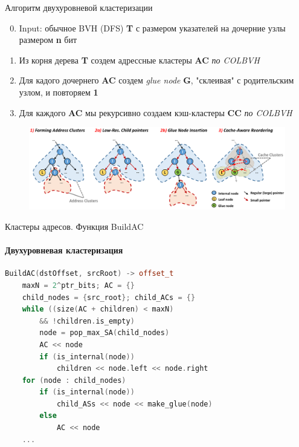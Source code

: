 \begin{frame}{Алгоритм двухуровневой кластеризации}
    \begin{enumerate}
        \setcounter{enumi}{-1}
        \item
            Input: обычное BVH (DFS) \textbf{T} с размером указателей на дочерние узлы размером \textbf{n} бит
        \item
            Из корня дерева \textbf{T} создем адрессные кластеры \textbf{AC} \textit{по COLBVH}
        \item
            Для кадого дочернего \textbf{AC} создем \textit{glue node} \textbf{G}, "склеивая" с родительским узлом, 
            и повторяем \textbf{1}
        \item
            Для каждого \textbf{AC} мы рекурсивно создаем кэш-кластеры \textbf{CC} \textit{по COLBVH}
    \end{enumerate}
    \begin{figure}
        \includegraphics[keepaspectratio, width=\textwidth]{res/2lvl_clustering.png}
    \end{figure}
\end{frame}

\begin{frame}[fragile]{Кластеры адресов. Функция BuildAC}
    \framesubtitle{Двухуровневая кластеризация}
    \begin{lstlisting}[language=C++,basicstyle=\ttfamily,keywordstyle=\color{blue}]
BuildAC(dstOffset, srcRoot) -> offset_t
    maxN = 2^ptr_bits; AC = {}
    child_nodes = {src_root}; child_ACs = {}
    while ((size(AC + children) < maxN)
        && !children.is_empty)
        node = pop_max_SA(child_nodes)
        AC << node
        if (is_internal(node))
            children << node.left << node.right
    for (node : child_nodes)
        if (is_internal(node))
            child_ASs << node << make_glue(node)
        else
            AC << node
    ...
    \end{lstlisting}
\end{frame}

